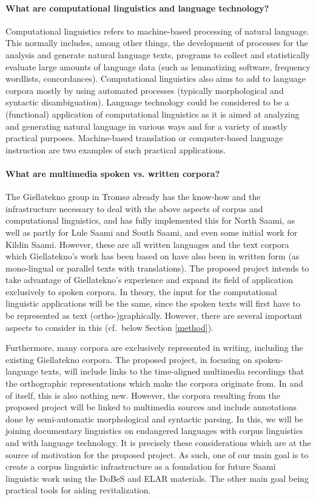 \documentclass[a4paper,12pt]{article}
\begin{document}
\paragraph{What are computational linguistics and language technology?} Computational linguistics refers to machine-based processing of natural language. This normally includes, among other things, the development of processes for the analysis and generate natural language texts, programs to collect and statistically evaluate large amounts of language data (such as lemmatizing software, frequency wordlists, concordances). Computational linguistics also aims to add to language corpora mostly by using automated processes (typically morphological and syntactic disambiguation). Language technology could be considered to be a (functional) application of computational linguistics as it is aimed at analyzing and generating natural language in various ways and for a variety of mostly practical purposes. Machine-based translation or computer-based language instruction are two examples of such practical applications.
 
\paragraph{What are multimedia spoken vs. written corpora?}
The Giellatekno group in Tromsø already has the know-how and the infrastructure necessary to deal with the above aspects of corpus and computational linguistics, and has fully implemented this for North Saami, as well as partly for Lule Saami and South Saami, and even some initial work for Kildin Saami. However, these are all written languages and the text corpora which Giellatekno's work has been based on have also been in written form (as mono-lingual or parallel texts with translations). The proposed project intends to take advantage of Giellatekno's experience and expand its field of application exclusively to spoken corpora. In theory, the input for the computational linguistic applications will be the same, since the spoken texts will first have to be represented as text (ortho-)graphically. However, there are several important aspects to consider in this (cf.~below Section \ref{method}).

Furthermore, many corpora are exclusively represented in writing, including the existing Giellatekno corpora. The proposed project, in focusing on spoken-language texts, will include links to the time-aligned multimedia recordings that the orthographic representations which make the corpora originate from. In and of itself, this is also nothing new. However, the corpora resulting from the proposed project will be linked to multimedia sources and include annotations done by semi-automatic morphological and syntactic parsing. In this, we will be joining documentary linguistics on endangered languages with corpus linguistics and with language technology. It is precisely these considerations which are at the source of motivation for the proposed project. As such, one of our main goal is to create a corpus linguistic infrastructure as a foundation for future Saami linguistic work using the DoBeS and ELAR materials. The other main goal being practical tools for aiding revitalization.
\end{document}
